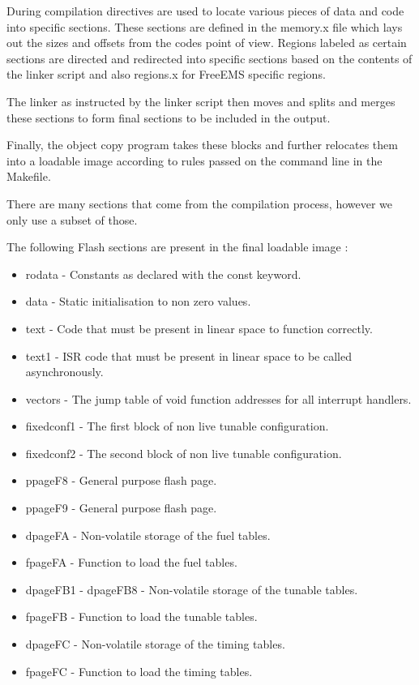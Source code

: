 \documentclass[12pt,a4wide,titlepage]{article}
\begin{document}
During compilation directives are used to locate various pieces of data and code into specific sections. These sections are defined in the memory.x file which lays out the sizes and offsets from the codes point of view. Regions labeled as certain sections are directed and redirected into specific sections based on the contents of the linker script and also regions.x for FreeEMS specific regions.

The linker as instructed by the linker script then moves and splits and merges these sections to form final sections to be included in the output.

Finally, the object copy program takes these blocks and further relocates them into a loadable image according to rules passed on the command line in the Makefile.

There are many sections that come from the compilation process, however we only use a subset of those.

The following Flash sections are present in the final loadable image :


\begin{itemize}
\item rodata - Constants as declared with the const keyword.
\item data - Static initialisation to non zero values.
\item text - Code that must be present in linear space to function correctly.
\item text1 - ISR code that must be present in linear space to be called asynchronously.
\item vectors - The jump table of void function addresses for all interrupt handlers.
\item fixedconf1 - The first block of non live tunable configuration.
\item fixedconf2 - The second block of non live tunable configuration.
\item ppageF8 - General purpose flash page.
\item ppageF9 - General purpose flash page.
\item dpageFA - Non-volatile storage of the fuel tables.
\item fpageFA - Function to load the fuel tables.
\item dpageFB1 - dpageFB8 - Non-volatile storage of the tunable tables.
\item fpageFB - Function to load the tunable tables.
\item dpageFC - Non-volatile storage of the timing tables.
\item fpageFC - Function to load the timing tables.
\end{itemize}
\end{document}
